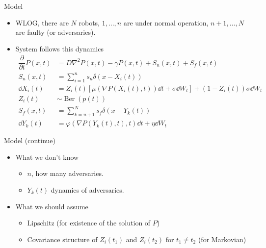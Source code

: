 \documentclass[10pt]{beamer}
\begin{document}
  \begin{frame}{Model}
    \begin{itemize}
      \item WLOG, there are $N$ robots, $1,\dots, n$ are under normal operation, $n+1, \dots, N$ are faulty (or adversaries).
      \item System follows this dynamics
        \begin{align*}
          \dfrac{\partial}{\partial t} P(x,t) &= D\nabla^2 P(x,t) - \gamma P(x,t) + S_n(x,t)+ S_f(x,t)\\
          S_n(x,t) &= \sum_{i=1}^{n}s_n\delta(x-X_i(t))\\
          \dd X_i(t) &= Z_i(t)\left[\mu(\nabla P(X_i(t),t))\dd t + \sigma \dd W_t\right] + (1-Z_i(t))\sigma\dd W_t\\
          Z_i(t) &\sim \operatorname{Ber}(p(t))\\
          S_f(x,t) &= \sum_{k=n+1}^N s_f \delta(x-Y_k(t))\\
          \dd Y_k(t) &= \varphi(\nabla P(Y_k(t),t),t)\dd t + \eta \dd W_t
        \end{align*}
    \end{itemize}
  \end{frame}
  \begin{frame}{Model (continue)}
  \begin{itemize}
  \item What we don't know
        \begin{itemize}
          \item $n$, how many adversaries.
          \item $Y_k(t)$ dynamics of adversaries.
        \end{itemize}
  \item What we should assume
    \begin{itemize}
      \item Lipschitz (for existence of the solution of $P$)
      \item Covariance structure of $Z_i(t_1)$ and $Z_i(t_2)$ for $t_1\neq t_2$ (for Markovian)
    \end{itemize}
  \end{itemize}
  \end{frame}
\end{document}
